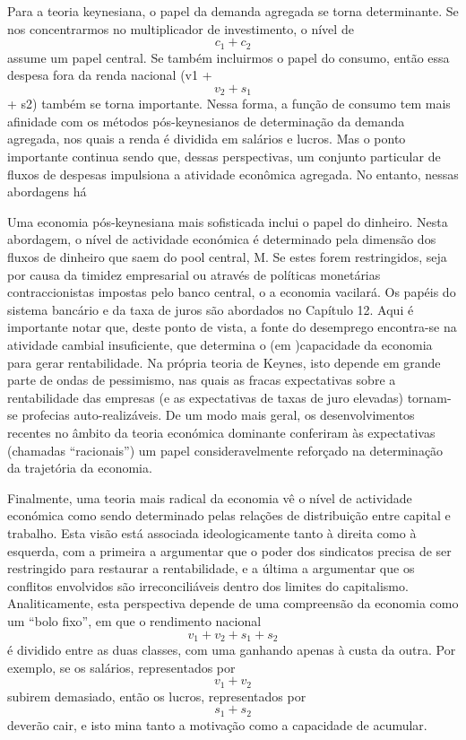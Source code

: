 Para a teoria keynesiana, o papel da demanda agregada se torna determinante. Se nos concentrarmos no multiplicador de investimento, o nível de  $$ c_{1} + c_{2} $$  assume um papel central. Se também incluirmos o papel do consumo, então essa despesa fora da renda nacional (v1 +  $$ v_{2} + s_{1} $$  + s2) também se torna importante. Nessa forma, a função de consumo tem mais afinidade com os métodos pós-keynesianos de determinação da demanda agregada, nos quais a renda é dividida em salários e lucros. Mas o ponto importante continua sendo que, dessas perspectivas, um conjunto particular de fluxos de despesas impulsiona a atividade econômica agregada. No entanto, nessas abordagens há
 \par 
Uma economia pós-keynesiana mais sofisticada inclui o papel do dinheiro. Nesta abordagem, o nível de actividade económica é determinado pela dimensão dos fluxos de dinheiro que saem do pool central, M. Se estes forem restringidos, seja por causa da timidez empresarial ou através de políticas monetárias contraccionistas impostas pelo banco central, o a economia vacilará. Os papéis do sistema bancário e da taxa de juros são abordados no Capítulo {\color{blue}12}. Aqui é importante notar que, deste ponto de vista, a fonte do desemprego encontra-se na atividade cambial insuficiente, que determina o (em )capacidade da economia para gerar rentabilidade. Na própria teoria de Keynes, isto depende em grande parte de ondas de pessimismo, nas quais as fracas expectativas sobre a rentabilidade das empresas (e as expectativas de taxas de juro elevadas) tornam-se profecias auto-realizáveis. De um modo mais geral, os desenvolvimentos recentes no âmbito da teoria económica dominante conferiram às expectativas (chamadas “racionais”) um papel consideravelmente reforçado na determinação da trajetória da economia.
 \par 
Finalmente, uma teoria mais radical da economia vê o nível de actividade económica como sendo determinado pelas relações de distribuição entre capital e trabalho. Esta visão está associada ideologicamente tanto à direita como à esquerda, com a primeira a argumentar que o poder dos sindicatos precisa de ser restringido para restaurar a rentabilidade, e a última a argumentar que os conflitos envolvidos são irreconciliáveis ​​dentro dos limites do capitalismo. Analiticamente, esta perspectiva depende de uma compreensão da economia como um “bolo fixo”, em que o rendimento nacional  $$ v_{1} + v_{2} + s_{1} + s_{2} $$  é dividido entre as duas classes, com uma ganhando apenas à custa da outra. Por exemplo, se os salários, representados por  $$ v_{1} + v_{2} $$   subirem demasiado, então os lucros, representados por  $$ s_{1} + s_{2} $$   deverão cair, e isto mina tanto a motivação como a capacidade de acumular.
